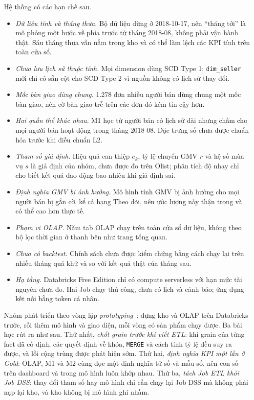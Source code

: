 \documentclass[a4paper]{article}
\begin{document}
Hệ thống có các hạn chế sau.
\begin{itemize}
  \item \textit{Dữ liệu tĩnh và tháng thưa.} Bộ dữ liệu dừng ở 2018-10-17, nên ``tháng tới'' là mô phỏng một bước về phía trước từ tháng 2018-08, không phải vận hành thật. Sáu tháng thưa vẫn nằm trong kho và có thể làm lệch các KPI tính trên toàn cửa sổ.
  \item \textit{Chưa lưu lịch sử thuộc tính.} Mọi dimension dùng SCD Type 1; \texttt{dim\_seller} mới chỉ có sẵn cột cho SCD Type 2 vì nguồn không có lịch sử thay đổi.
  \item \textit{Mốc bàn giao dùng chung.} 1.278 đơn nhiều người bán dùng chung một mốc bàn giao, nên cờ bàn giao trễ trên các đơn đó kém tin cậy hơn.
  \item \textit{Hai quần thể khác nhau.} M1 học từ người bán có lịch sử dài nhưng chấm cho mọi người bán hoạt động trong tháng 2018-08. Đặc trưng số chưa được chuẩn hóa trước khi điều chuẩn L2.
  \item \textit{Tham số giả định.} Hiệu quả can thiệp $e_k$, tỷ lệ chuyển GMV $r$ và hệ số mùa vụ $s$ là giả định của nhóm, chưa được đo trên Olist; phân tích độ nhạy chỉ cho biết kết quả dao động bao nhiêu khi giả định sai.
  \item \textit{Định nghĩa GMV bị ảnh hưởng.} Mô hình tính GMV bị ảnh hưởng cho mọi người bán bị gắn cờ, kể cả hạng Theo dõi, nên ước lượng này thận trọng và có thể cao hơn thực tế.
  \item \textit{Phạm vi OLAP.} Năm tab OLAP chạy trên toàn cửa sổ dữ liệu, không theo bộ lọc thời gian ở thanh bên như trang tổng quan.
  \item \textit{Chưa có backtest.} Chính sách chưa được kiểm chứng bằng cách chạy lại trên nhiều tháng quá khứ và so với kết quả thật của tháng sau.
  \item \textit{Hạ tầng.} Databricks Free Edition chỉ có compute serverless với hạn mức tài nguyên chưa đo. Hai Job chạy thủ công, chưa có lịch và cảnh báo; ứng dụng kết nối bằng token cá nhân.
\end{itemize}

Nhóm phát triển theo vòng lặp \textit{prototyping}~\cite{bib:turban_dss}: dựng kho và OLAP trên Databricks trước, rồi thêm mô hình và giao diện, mỗi vòng có sản phẩm chạy được. Ba bài học rút ra như sau. Thứ nhất, \textit{chốt grain trước khi viết ETL}: khi grain của từng fact đã cố định, các quyết định về khóa, \texttt{MERGE} và cách tính tỷ lệ đều suy ra được, và lỗi cộng trùng được phát hiện sớm. Thứ hai, \textit{định nghĩa KPI một lần ở Gold}: OLAP, M1 và M2 cùng đọc một định nghĩa tử số và mẫu số, nên con số trên dashboard và trong mô hình luôn khớp nhau. Thứ ba, \textit{tách Job ETL khỏi Job DSS}: thay đổi tham số hay mô hình chỉ cần chạy lại Job DSS mà không phải nạp lại kho, và kho không bị mô hình ghi nhầm.
\end{document}

